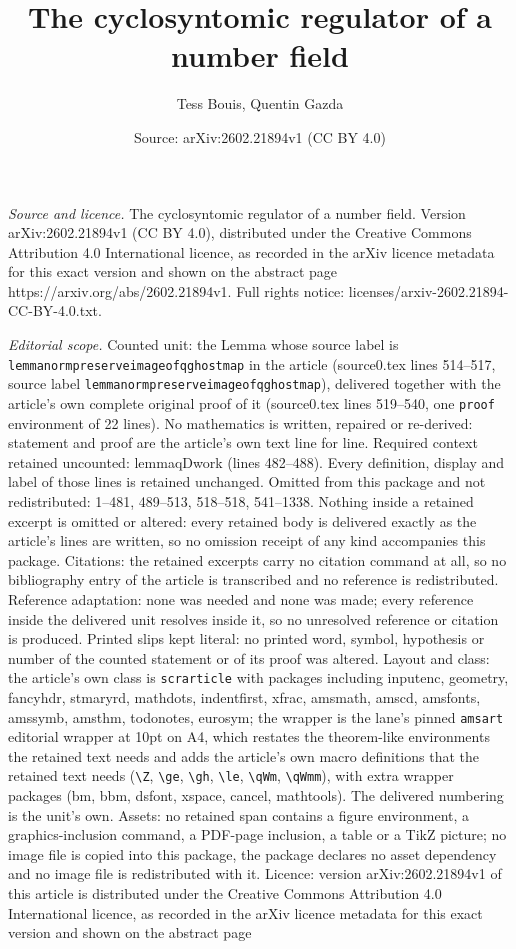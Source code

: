 \documentclass[10pt,a4paper]{amsart}
\title[The cyclosyntomic regulator of a number field]{The cyclosyntomic regulator of a number field}
\author{Tess Bouis, Quentin Gazda}
\date{Source: arXiv:2602.21894v1 (CC BY 4.0)}
\begin{document}
\maketitle

\noindent\emph{Source and licence.} The cyclosyntomic regulator of a number field. Version arXiv:2602.21894v1 (CC BY 4.0), distributed under the Creative Commons Attribution 4.0 International licence, as recorded in the arXiv licence metadata for this exact version and shown on the abstract page https://arxiv.org/abs/2602.21894v1. Full rights notice: licenses/arxiv-2602.21894-CC-BY-4.0.txt.\par\smallskip

\noindent\textit{Editorial scope.} Counted unit: the Lemma whose source label is \texttt{lemmanormpreserveimageofqghostmap} in the article (source0.tex lines 514--517, source label \texttt{lemmanormpreserveimageofqghostmap}), delivered together with the article's own complete original proof of it (source0.tex lines 519--540, one \texttt{proof} environment of 22 lines). No mathematics is written, repaired or re-derived: statement and proof are the article's own text line for line. Required context retained uncounted: lemmaqDwork (lines 482--488). Every definition, display and label of those lines is retained unchanged. Omitted from this package and not redistributed: 1--481, 489--513, 518--518, 541--1338. Nothing inside a retained excerpt is omitted or altered: every retained body is delivered exactly as the article's lines are written, so no omission receipt of any kind accompanies this package. Citations: the retained excerpts carry no citation command at all, so no bibliography entry of the article is transcribed and no reference is redistributed. Reference adaptation: none was needed and none was made; every reference inside the delivered unit resolves inside it, so no unresolved reference or citation is produced. Printed slips kept literal: no printed word, symbol, hypothesis or number of the counted statement or of its proof was altered. Layout and class: the article's own class is \texttt{scrarticle} with packages including inputenc, geometry, fancyhdr, stmaryrd, mathdots, indentfirst, xfrac, amsmath, amscd, amsfonts, amssymb, amsthm, todonotes, eurosym; the wrapper is the lane's pinned \texttt{amsart} editorial wrapper at 10pt on A4, which restates the theorem-like environments the retained text needs and adds the article's own macro definitions that the retained text needs (\texttt{\textbackslash Z}, \texttt{\textbackslash ge}, \texttt{\textbackslash gh}, \texttt{\textbackslash le}, \texttt{\textbackslash qWm}, \texttt{\textbackslash qWmm}), with extra wrapper packages (bm, bbm, dsfont, xspace, cancel, mathtools). The delivered numbering is the unit's own. Assets: no retained span contains a figure environment, a graphics-inclusion command, a PDF-page inclusion, a table or a TikZ picture; no image file is copied into this package, the package declares no asset dependency and no image file is redistributed with it. Licence: version arXiv:2602.21894v1 of this article is distributed under the Creative Commons Attribution 4.0 International licence, as recorded in the arXiv licence metadata for this exact version and shown on the abstract page 
\end{document}
